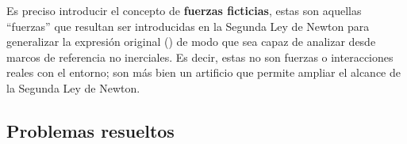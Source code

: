 \documentclass[/home/hernan-barquero/Documents/Apuntes_mecanica_teorica/main.tex]{subfiles}
\begin{document}
	Es preciso introducir el concepto de \textbf{fuerzas ficticias}, estas son aquellas ``fuerzas'' que resultan ser introducidas en la Segunda Ley de Newton para generalizar la expresión original () de modo que sea capaz de analizar desde marcos de referencia no inerciales. Es decir, estas no son fuerzas o interacciones reales con el entorno; son más bien un artificio que permite ampliar el alcance de la Segunda Ley de Newton.

	\subsection{Problemas resueltos}
	
\end{document}
